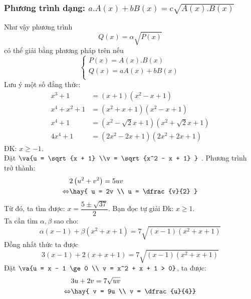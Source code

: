 \subsubsection{Phương trình dạng: $a.A\left( x \right) + bB\left( x \right) = c\sqrt {A\left( x \right).B\left( x \right)} $}
Như vậy phương trình $$Q\left( x \right) = \alpha \sqrt {P\left( x \right)} $$ có thể giải bằng phương pháp trên nếu 
 $$\left\{ \begin{array}{l}
 P\left( x \right) = A\left( x \right).B\left( x \right) \\ 
 Q\left( x \right) = aA\left( x \right) + bB\left( x \right) \\ 
 \end{array} \right.$$
Lưu ý một số đẳng thức: 
\begin{align}
x^3 + 1 &= \left( {x + 1} \right)\left( {x^2 - x + 1} \right) \\
 x^4 + x^2 + 1 &=  \left( {x^2 + x + 1} \right)\left( {x^2 - x + 1} \right) \\
x^4 + 1 & = \left( {x^2 - \sqrt 2 x + 1} \right)\left( {x^2 + \sqrt 2 x + 1} \right) \\
4x^4 + 1 & = \left( {2x^2 - 2x + 1} \right)\left( {2x^2 + 2x + 1} \right)
\end{align}
\hda
ĐK: $x\ge -1$.\\
 Đặt $\va{u = \sqrt {x + 1} \\v = \sqrt {x^2 - x + 1} }$ . Phương trình trở thành:  
\begin{align*}
& 2\left( {u^2 + v^2 } \right) = 5uv \\ \Leftrightarrow & \hay{
 u = 2v \\  u = \dfrac{v}{2} }
\end{align*}
Từ đó, ta tìm được: $x = \dfrac{{5 \pm \sqrt {37} }}{2}$.
\hda
Bạn đọc tự giải
\hda 
Đk: $x \ge 1$.\\
Ta cần tìm $\alpha, \beta$ sao cho: $$\alpha \left( {x - 1} \right) + \beta \left( {x^2 + x + 1} \right) = 7\sqrt {\left( {x - 1} \right)\left( {x^2 + x + 1} \right)} $$
Đồng nhất thức ta được
$$3\left( {x - 1} \right) + 2\left( {x + x + 1} \right) = 7\sqrt {\left( {x - 1} \right)\left( {x^2 + x + 1} \right)} $$
Đặt $\va{u = x - 1 \ge 0  \\ v = x^2 + x + 1 > 0}$, ta được: 
\begin{align*}
& 3u + 2v = 7\sqrt {uv} \\
\Leftrightarrow & \hay{
 v = 9u \\ 
 v = \dfrac{u}{4}} \end{align*}
